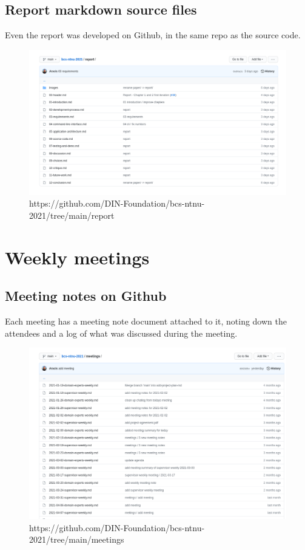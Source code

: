 \subsection{Report markdown source files}

Even the report was developed on Github, in the same repo as the source code.

    \begin{figure}[htbp]
      \centering
      \includegraphics[width=.8\textwidth]{figures/github-report}
      \caption[Report]{https://github.com/DIN-Foundation/bcs-ntnu-2021/tree/main/report}
    \end{figure}




\section{Weekly meetings}

\subsection{Meeting notes on Github}

Each meeting has a meeting note document attached to it, noting down the attendees
and a log of what was discussed during the meeting.

    \begin{figure}[htbp]
      \centering
      \includegraphics[width=.7\textwidth]{figures/github-meetings}
      \caption[Meeting notes]{https://github.com/DIN-Foundation/bcs-ntnu-2021/tree/main/meetings}
    \end{figure}


